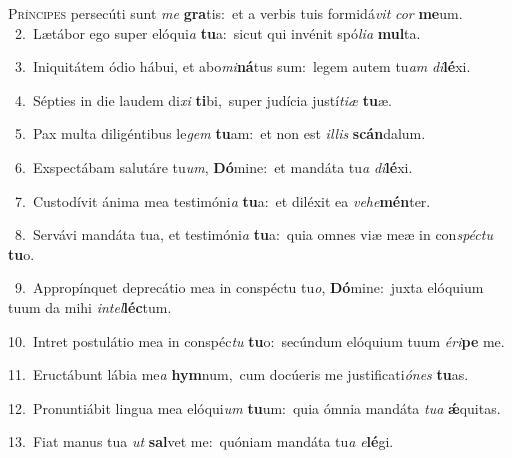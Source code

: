 \lettrine{\initial\textcolor{\initialcolor}{P}}{ríncipes} persecúti sunt \textit{me} \textbf{gra}\-tis:~\star et a verbis tuis formidá\textit{vit} \textit{cor} \textbf{me}\-um.\\
{\numbfont\textcolor{\numbcolor}{~2.}}~Lætábor ego super elóqui\textit{a} \textbf{tu}\-a:~\star sicut qui invénit spó\-\textit{li}\-\textit{a} \textbf{mul}\-ta.\par
{\numbfont\textcolor{\numbcolor}{~3.}}~Iniquitátem ódio hábui, et abo\-\textit{mi}\-\textbf{ná}tus sum:~\star legem autem tu\textit{am} \textit{di}\-\textbf{lé}xi.\par
{\numbfont\textcolor{\numbcolor}{~4.}}~Sépties in die laudem di\textit{xi} \textbf{ti}\-bi,~\star super judícia justí\-\textit{ti}\-\textit{æ} \textbf{tu}\-æ.\par
{\numbfont\textcolor{\numbcolor}{~5.}}~Pax multa diligéntibus le\textit{gem} \textbf{tu}\-am:~\star et non est \textit{il}\-\textit{lis} \textbf{scán}\-dalum.\par
{\numbfont\textcolor{\numbcolor}{~6.}}~Exspectábam salutáre tu\-\textit{um}\-, \textbf{Dó}\-mine:~\star et mandáta tu\textit{a} \textit{di}\-\textbf{lé}xi.\par
{\numbfont\textcolor{\numbcolor}{~7.}}~Custodívit ánima mea testimóni\textit{a} \textbf{tu}\-a:~\star et diléxit ea \textit{ve}\-\textit{he}\textbf{mén}ter.\par
{\numbfont\textcolor{\numbcolor}{~8.}}~Servávi mandáta tua, et testimóni\textit{a} \textbf{tu}\-a:~\star quia omnes viæ meæ in con\-\textit{spéc}\-\textit{tu} \textbf{tu}\-o.\par
{\numbfont\textcolor{\numbcolor}{~9.}}~Appropínquet deprecátio mea in conspéctu tu\-\textit{o}\-, \textbf{Dó}\-mine:~\star juxta elóquium tuum da mihi \textit{in}\-\textit{tel}\textbf{léc}tum.\par
{\numbfont\textcolor{\numbcolor}{10.}}~Intret postulátio mea in conspéc\textit{tu} \textbf{tu}\-o:~\star secúndum elóquium tuum \textit{é}\-\textit{ri}\textbf{pe} me.\par
{\numbfont\textcolor{\numbcolor}{11.}}~Eructábunt lábia me\textit{a} \textbf{hym}\-num,~\star cum docúeris me justificati\-\textit{ó}\-\textit{nes} \textbf{tu}\-as.\par
{\numbfont\textcolor{\numbcolor}{12.}}~Pronuntiábit lingua mea elóqui\textit{um} \textbf{tu}\-um:~\star quia ómnia mandáta \textit{tu}\-\textit{a} \textbf{ǽ}\-quitas.\par
{\numbfont\textcolor{\numbcolor}{13.}}~Fiat manus tua \textit{ut} \textbf{sal}\-vet me:~\star quóniam mandáta tu\textit{a} \textit{e}\-\textbf{lé}gi.\par
